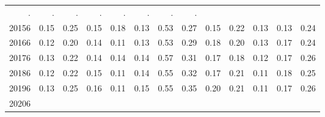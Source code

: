 \begin{table}[!h]
\begin{tabular}{lllllllllllll}
  \multicolumn{1}{r}{.} &
  \multicolumn{1}{r}{.} &
  \multicolumn{1}{r}{.} &
  \multicolumn{1}{r}{.} &
  \multicolumn{1}{r}{.} &
  \multicolumn{1}{r}{.} &
  \multicolumn{1}{r}{.} &
  \multicolumn{1}{r}{.} \\
\multicolumn{1}{l}{\hspace{1em}20156} &
  \multicolumn{1}{|r}{0.15} &
  \multicolumn{1}{r}{0.25} &
  \multicolumn{1}{r}{0.15} &
  \multicolumn{1}{r}{0.18} &
  \multicolumn{1}{r}{0.13} &
  \multicolumn{1}{r}{0.53} &
  \multicolumn{1}{r}{0.27} &
  \multicolumn{1}{r}{0.15} &
  \multicolumn{1}{r}{0.22} &
  \multicolumn{1}{r}{0.13} &
  \multicolumn{1}{r}{0.13} &
  \multicolumn{1}{r}{0.24} \\
\multicolumn{1}{l}{\hspace{1em}20166} &
  \multicolumn{1}{|r}{0.12} &
  \multicolumn{1}{r}{0.20} &
  \multicolumn{1}{r}{0.14} &
  \multicolumn{1}{r}{0.11} &
  \multicolumn{1}{r}{0.13} &
  \multicolumn{1}{r}{0.53} &
  \multicolumn{1}{r}{0.29} &
  \multicolumn{1}{r}{0.18} &
  \multicolumn{1}{r}{0.20} &
  \multicolumn{1}{r}{0.13} &
  \multicolumn{1}{r}{0.17} &
  \multicolumn{1}{r}{0.24} \\
\multicolumn{1}{l}{\hspace{1em}20176} &
  \multicolumn{1}{|r}{0.13} &
  \multicolumn{1}{r}{0.22} &
  \multicolumn{1}{r}{0.14} &
  \multicolumn{1}{r}{0.14} &
  \multicolumn{1}{r}{0.14} &
  \multicolumn{1}{r}{0.57} &
  \multicolumn{1}{r}{0.31} &
  \multicolumn{1}{r}{0.17} &
  \multicolumn{1}{r}{0.18} &
  \multicolumn{1}{r}{0.12} &
  \multicolumn{1}{r}{0.17} &
  \multicolumn{1}{r}{0.26} \\
\multicolumn{1}{l}{\hspace{1em}20186} &
  \multicolumn{1}{|r}{0.12} &
  \multicolumn{1}{r}{0.22} &
  \multicolumn{1}{r}{0.15} &
  \multicolumn{1}{r}{0.11} &
  \multicolumn{1}{r}{0.14} &
  \multicolumn{1}{r}{0.55} &
  \multicolumn{1}{r}{0.32} &
  \multicolumn{1}{r}{0.17} &
  \multicolumn{1}{r}{0.21} &
  \multicolumn{1}{r}{0.11} &
  \multicolumn{1}{r}{0.18} &
  \multicolumn{1}{r}{0.25} \\
\multicolumn{1}{l}{\hspace{1em}20196} &
  \multicolumn{1}{|r}{0.13} &
  \multicolumn{1}{r}{0.25} &
  \multicolumn{1}{r}{0.16} &
  \multicolumn{1}{r}{0.11} &
  \multicolumn{1}{r}{0.15} &
  \multicolumn{1}{r}{0.55} &
  \multicolumn{1}{r}{0.35} &
  \multicolumn{1}{r}{0.20} &
  \multicolumn{1}{r}{0.21} &
  \multicolumn{1}{r}{0.11} &
  \multicolumn{1}{r}{0.17} &
  \multicolumn{1}{r}{0.26} \\
\multicolumn{1}{l}{\hspace{1em}20206} &

\end{tabular}
\end{table}
